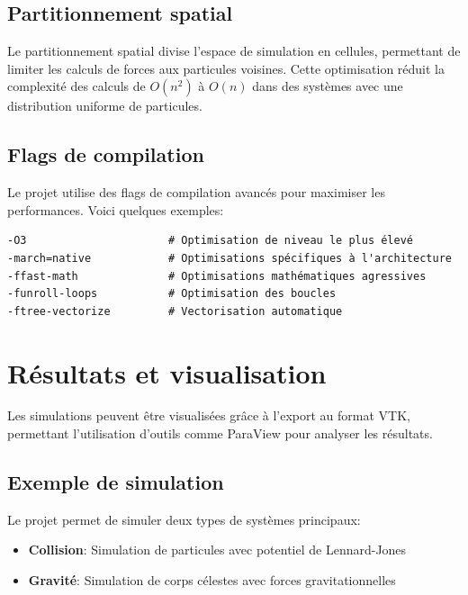 \documentclass[12pt,a4paper]{article}
\begin{document}
\subsection{Partitionnement spatial}

Le partitionnement spatial divise l'espace de simulation en cellules, permettant de limiter les calculs de forces aux particules voisines. Cette optimisation réduit la complexité des calculs de $O(n^2)$ à $O(n)$ dans des systèmes avec une distribution uniforme de particules.

\subsection{Flags de compilation}

Le projet utilise des flags de compilation avancés pour maximiser les performances. Voici quelques exemples:

\begin{verbatim}
-O3                      # Optimisation de niveau le plus élevé
-march=native            # Optimisations spécifiques à l'architecture
-ffast-math              # Optimisations mathématiques agressives
-funroll-loops           # Optimisation des boucles
-ftree-vectorize         # Vectorisation automatique
\end{verbatim}

\section{Résultats et visualisation}

Les simulations peuvent être visualisées grâce à l'export au format VTK, permettant l'utilisation d'outils comme ParaView pour analyser les résultats.



\subsection{Exemple de simulation}

Le projet permet de simuler deux types de systèmes principaux:

\begin{itemize}
    \item \textbf{Collision}: Simulation de particules avec potentiel de Lennard-Jones
    \item \textbf{Gravité}: Simulation de corps célestes avec forces gravitationnelles
\end{itemize}
\end{document}
